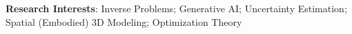 \newcommand{\researchinterests}{%
  {\centering \small
   \textbf{Research Interests}: Inverse Problems; Generative AI; Uncertainty Estimation; Spatial (Embodied) 3D Modeling; Optimization Theory\par}%
  \vspace{.12\baselineskip}%
  \vspace{.30\baselineskip}%
}

\setlength{\emergencystretch}{3em}


\makecvtitle
\vspace{-3em}
\headerdivider
\researchinterests





\vspace{-1em}




